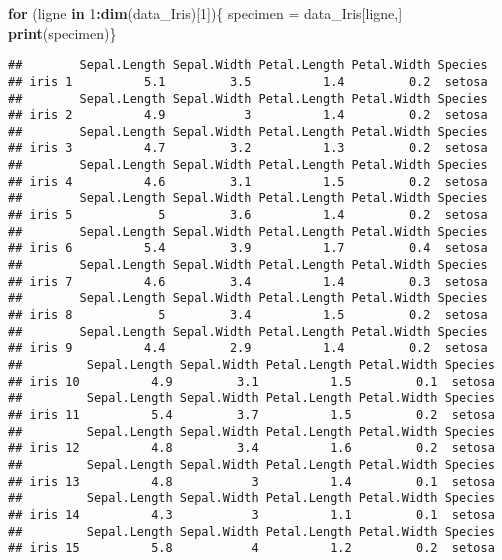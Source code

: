 \documentclass[
]{article}
\newenvironment{Shaded}{\begin{snugshade}}{\end{snugshade}}
\newcommand{\ControlFlowTok}[1]{\textcolor[rgb]{0.13,0.29,0.53}{\textbf{#1}}}
\newcommand{\DecValTok}[1]{\textcolor[rgb]{0.00,0.00,0.81}{#1}}
\newcommand{\FunctionTok}[1]{\textcolor[rgb]{0.13,0.29,0.53}{\textbf{#1}}}
\newcommand{\NormalTok}[1]{#1}
\newcommand{\OtherTok}[1]{\textcolor[rgb]{0.56,0.35,0.01}{#1}}
\newcommand{\SpecialCharTok}[1]{\textcolor[rgb]{0.81,0.36,0.00}{\textbf{#1}}}
\begin{document}
\begin{Shaded}
\begin{Highlighting}[]
\ControlFlowTok{for}\NormalTok{ (ligne }\ControlFlowTok{in} \DecValTok{1}\SpecialCharTok{:}\FunctionTok{dim}\NormalTok{(data\_Iris)[}\DecValTok{1}\NormalTok{])\{}
\NormalTok{  specimen }\OtherTok{=}\NormalTok{ data\_Iris[ligne,]}
\FunctionTok{print}\NormalTok{(specimen)\}}
\end{Highlighting}
\end{Shaded}

\begin{verbatim}
##        Sepal.Length Sepal.Width Petal.Length Petal.Width Species
## iris 1          5.1         3.5          1.4         0.2  setosa
##        Sepal.Length Sepal.Width Petal.Length Petal.Width Species
## iris 2          4.9           3          1.4         0.2  setosa
##        Sepal.Length Sepal.Width Petal.Length Petal.Width Species
## iris 3          4.7         3.2          1.3         0.2  setosa
##        Sepal.Length Sepal.Width Petal.Length Petal.Width Species
## iris 4          4.6         3.1          1.5         0.2  setosa
##        Sepal.Length Sepal.Width Petal.Length Petal.Width Species
## iris 5            5         3.6          1.4         0.2  setosa
##        Sepal.Length Sepal.Width Petal.Length Petal.Width Species
## iris 6          5.4         3.9          1.7         0.4  setosa
##        Sepal.Length Sepal.Width Petal.Length Petal.Width Species
## iris 7          4.6         3.4          1.4         0.3  setosa
##        Sepal.Length Sepal.Width Petal.Length Petal.Width Species
## iris 8            5         3.4          1.5         0.2  setosa
##        Sepal.Length Sepal.Width Petal.Length Petal.Width Species
## iris 9          4.4         2.9          1.4         0.2  setosa
##         Sepal.Length Sepal.Width Petal.Length Petal.Width Species
## iris 10          4.9         3.1          1.5         0.1  setosa
##         Sepal.Length Sepal.Width Petal.Length Petal.Width Species
## iris 11          5.4         3.7          1.5         0.2  setosa
##         Sepal.Length Sepal.Width Petal.Length Petal.Width Species
## iris 12          4.8         3.4          1.6         0.2  setosa
##         Sepal.Length Sepal.Width Petal.Length Petal.Width Species
## iris 13          4.8           3          1.4         0.1  setosa
##         Sepal.Length Sepal.Width Petal.Length Petal.Width Species
## iris 14          4.3           3          1.1         0.1  setosa
##         Sepal.Length Sepal.Width Petal.Length Petal.Width Species
## iris 15          5.8           4          1.2         0.2  setosa

\end{verbatim}
\end{document}
